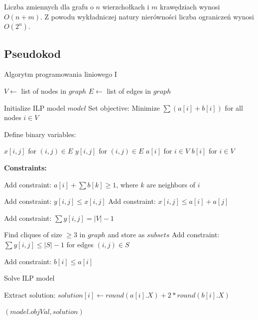 Liczba zmiennych dla grafu o $n$ wierzchołkach i $m$ krawędziach wynosi $O(n+m)$.
Z powodu wykładniczej natury nierówności liczba ograniczeń wynosi $O(2^n)$.

\subsection{Pseudokod}

\begin{algorithm}
    \caption*{Algorytm programowania liniowego I}
    \begin{algorithmic}[1]
            \State $V \gets$ list of nodes in $graph$
            \State $E \gets$ list of edges in $graph$
    
            \State Initialize ILP model $model$
            \State Set objective: Minimize $\sum (a[i] + b[i])$ for all nodes $i \in V$
    
            \State Define binary variables:

            \State $x[i, j]$ for $(i, j) \in E$ 
            \State $y[i, j]$ for $(i, j) \in E$ 
            \State $a[i]$ for $i \in V$ 
            \State $b[i]$ for $i \in V$ 
    
            \State \textbf{Constraints:}
    
             
                \State Add constraint: $a[i] + \sum b[k] \geq 1$, where $k$ are neighbors of $i$
            \EndFor
    
                \State Add constraint: $y[i, j] \leq x[i, j]$ 
                \State Add constraint: $x[i, j] \leq a[i] + a[j]$ 
            \EndFor
    
            \State Add constraint: $\sum y[i, j] = |V| - 1$ 
    
            \State Find cliques of size $\geq 3$ in $graph$ and store as $subsets$
             
                \State Add constraint: $\sum y[i, j] \leq |S| - 1$ for edges $(i, j) \in S$
            \EndFor
    
             
                \State Add constraint: $b[i] \leq a[i]$
            \EndFor
    
            \State Solve ILP model
    
            \State Extract solution:
                \State $solution[i] \gets round(a[i].X) + 2 * round(b[i].X)$
            \EndFor
    
            \State \Return $(model.objVal, solution)$
        \EndFunction
    \end{algorithmic}
\end{algorithm}

